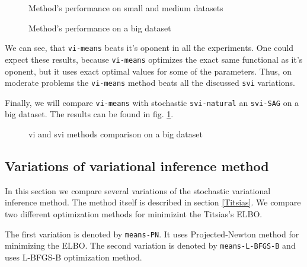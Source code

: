 \documentclass[12pt]{article}
\begin{document}
	\begin{figure}[!h]
			\centering
			\subfloat{
				\scalebox{0.9}{
					
				}
			}
			\subfloat{
				\scalebox{0.9}{
		    		
				}
			}
			
			\caption{Method's performance on small and medium datasets}
		\end{figure}
	\begin{figure}[!h]
		\centering
		\subfloat{
			\scalebox{0.9}{
		    	
			}
		}
		\caption{Method's performance on a big dataset}
	\end{figure}

	We can see, that \lstinline{vi-means} beats it's oponent in all the experiments. One could expect these results, because \lstinline{vi-means} optimizes the exact same functional as it's oponent, but it uses exact optimal values for some of the parameters. Thus, on moderate problems the \lstinline{vi-means} method beats all the discussed \lstinline{svi} variations.

	Finally, we will compare \lstinline{vi-means} with stochastic \lstinline{svi-natural} an \lstinline{svi-SAG} on a big dataset. The results can be found in fig. \ref{visvi_big}.

	\begin{figure}[!h]
	\centering
	\caption{vi and svi methods comparison on a big dataset}
	\label{visvi_big}
\end{figure}


\subsection{Variations of variational inference method}
	In this section we compare several variations of the stochastic variational inference method. The method itself is described in section \ref{Titsias}. We compare two different optimization methods for minimizint the Titsias's ELBO.

	The first variation is denoted by \lstinline{means-PN}. It uses Projected-Newton method for minimizing the ELBO. The second variation is denoted by \lstinline{means-L-BFGS-B} and uses L-BFGS-B optimization method.
\end{document}
